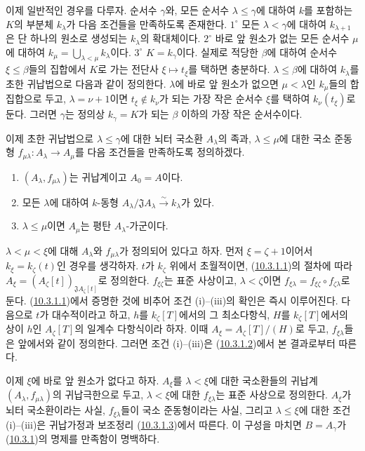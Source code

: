 \begin{env}[10.3.1.4]
\label{0.10.3.1.4-fr}
이제 일반적인 경우를 다루자. 순서수 $\gamma$와, 모든 순서수
$\lambda\leq\gamma$에 대하여 $k$를 포함하는 $K$의 부분체
$k_\lambda$가 다음 조건들을 만족하도록 존재한다. $1^\circ$ 모든
$\lambda<\gamma$에 대하여 $k_{\lambda+1}$은 단 하나의 원소로 생성되는
$k_\lambda$의 확대체이다. $2^\circ$ 바로 앞 원소가 없는 모든 순서수
$\mu$에 대하여
$k_\mu=\bigcup_{\lambda<\mu}k_\lambda$이다. $3^\circ$ $K=k_\gamma$이다.
실제로 적당한 $\beta$에 대하여 순서수 $\xi\leq\beta$들의 집합에서
$K$로 가는 전단사 $\xi\mapsto t_\xi$를 택하면 충분하다.
$\lambda\leq\beta$에 대하여 $k_\lambda$를 초한 귀납법으로 다음과 같이
정의한다. $\lambda$에 바로 앞 원소가 없으면 $\mu<\lambda$인
$k_\mu$들의 합집합으로 두고, $\lambda=\nu+1$이면
$t_\xi\notin k_\nu$가 되는 가장 작은 순서수 $\xi$를 택하여
$k_\nu(t_\xi)$로 둔다. 그러면 $\gamma$는 정의상
$k_\gamma=K$가 되는 $\beta$ 이하의 가장 작은 순서수이다.

이제 초한 귀납법으로 $\lambda\leq\gamma$에 대한 뇌터 국소환
$A_\lambda$의 족과, $\lambda\leq\mu$에 대한 국소 준동형
$f_{\mu\lambda}:A_\lambda\to A_\mu$를 다음 조건들을 만족하도록
정의하겠다.
\begin{enumerate}
  \item[(i)] $(A_\lambda,f_{\mu\lambda})$는 귀납계이고 $A_0=A$이다.
  \item[(ii)] 모든 $\lambda$에 대하여 $k$-동형
    $A_\lambda/\mathfrak J A_\lambda\xrightarrow{\sim}k_\lambda$가 있다.
  \item[(iii)] $\lambda\leq\mu$이면 $A_\mu$는 평탄
    $A_\lambda$-가군이다.
\end{enumerate}

$\lambda<\mu<\xi$에 대해 $A_\lambda$와 $f_{\mu\lambda}$가 정의되어
있다고 하자. 먼저 $\xi=\zeta+1$이어서
$k_\xi=k_\zeta(t)$인 경우를 생각하자. $t$가 $k_\zeta$ 위에서
초월적이면, (\hyperref[0.10.3.1.1-fr]{10.3.1.1})의 절차에 따라
$A_\xi=(A_\zeta[t])_{\mathfrak J A_\zeta[t]}$로 정의한다.
$f_{\xi\zeta}$는 표준 사상이고, $\lambda<\zeta$이면
$f_{\xi\lambda}=f_{\xi\zeta}\circ f_{\zeta\lambda}$로 둔다.
(\hyperref[0.10.3.1.1-fr]{10.3.1.1})에서 증명한 것에 비추어 조건
(i)--(iii)의 확인은 즉시 이루어진다. 다음으로 $t$가 대수적이라고 하고,
$h$를 $k_\zeta[T]$에서의 그 최소다항식, $H$를 $k_\zeta[T]$에서의 상이
$h$인 $A_\zeta[T]$의 일계수 다항식이라 하자. 이때
$A_\xi=A_\zeta[T]/(H)$로 두고, $f_{\xi\lambda}$들은 앞에서와 같이
정의한다. 그러면 조건 (i)--(iii)은
(\hyperref[0.10.3.1.2-fr]{10.3.1.2})에서 본 결과로부터 따른다.

이제 $\xi$에 바로 앞 원소가 없다고 하자. $A_\xi$를
$\lambda<\xi$에 대한 국소환들의 귀납계
$(A_\lambda,f_{\mu\lambda})$의 귀납극한으로 두고,
$\lambda<\xi$에 대한 $f_{\xi\lambda}$는 표준 사상으로 정의한다.
$A_\xi$가 뇌터 국소환이라는 사실, $f_{\xi\lambda}$들이 국소
준동형이라는 사실, 그리고 $\lambda\leq\xi$에 대한 조건 (i)--(iii)은
귀납가정과 보조정리
(\hyperref[0.10.3.1.3-fr]{10.3.1.3})에서 따른다. 이 구성을 마치면
$B=A_\gamma$가 (\hyperref[0.10.3.1-fr]{10.3.1})의 명제를 만족함이
명백하다.
\end{env}

